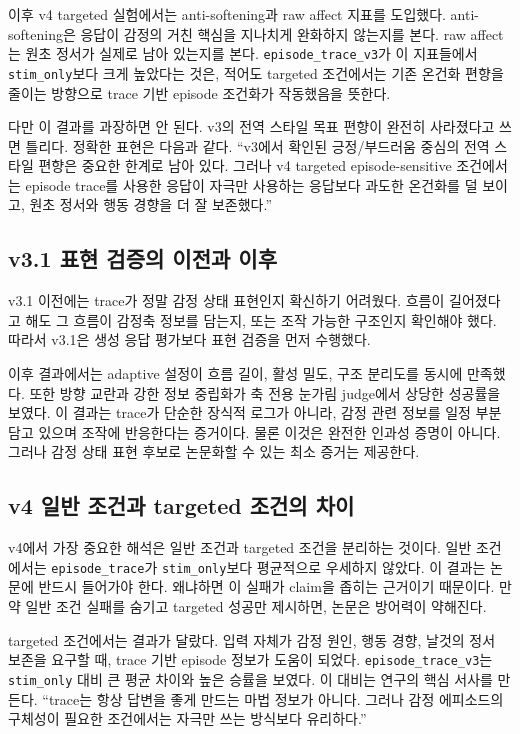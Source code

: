 \documentclass[11pt,a4paper]{article}
\newcommand{\eng}[1]{\texttt{#1}}
\begin{document}
이후 v4 targeted 실험에서는 anti-softening과 raw affect 지표를 도입했다. anti-softening은 응답이 감정의 거친 핵심을 지나치게 완화하지 않는지를 본다. raw affect는 원초 정서가 실제로 남아 있는지를 본다. \eng{episode\_trace\_v3}가 이 지표들에서 \eng{stim\_only}보다 크게 높았다는 것은, 적어도 targeted 조건에서는 기존 온건화 편향을 줄이는 방향으로 trace 기반 episode 조건화가 작동했음을 뜻한다.

다만 이 결과를 과장하면 안 된다. v3의 전역 스타일 목표 편향이 완전히 사라졌다고 쓰면 틀리다. 정확한 표현은 다음과 같다. ``v3에서 확인된 긍정/부드러움 중심의 전역 스타일 편향은 중요한 한계로 남아 있다. 그러나 v4 targeted episode-sensitive 조건에서는 episode trace를 사용한 응답이 자극만 사용하는 응답보다 과도한 온건화를 덜 보이고, 원초 정서와 행동 경향을 더 잘 보존했다.''

\subsection{v3.1 표현 검증의 이전과 이후}

v3.1 이전에는 trace가 정말 감정 상태 표현인지 확신하기 어려웠다. 흐름이 길어졌다고 해도 그 흐름이 감정축 정보를 담는지, 또는 조작 가능한 구조인지 확인해야 했다. 따라서 v3.1은 생성 응답 평가보다 표현 검증을 먼저 수행했다.

이후 결과에서는 adaptive 설정이 흐름 길이, 활성 밀도, 구조 분리도를 동시에 만족했다. 또한 방향 교란과 강한 정보 중립화가 축 전용 눈가림 judge에서 상당한 성공률을 보였다. 이 결과는 trace가 단순한 장식적 로그가 아니라, 감정 관련 정보를 일정 부분 담고 있으며 조작에 반응한다는 증거이다. 물론 이것은 완전한 인과성 증명이 아니다. 그러나 감정 상태 표현 후보로 논문화할 수 있는 최소 증거는 제공한다.

\subsection{v4 일반 조건과 targeted 조건의 차이}

v4에서 가장 중요한 해석은 일반 조건과 targeted 조건을 분리하는 것이다. 일반 조건에서는 \eng{episode\_trace}가 \eng{stim\_only}보다 평균적으로 우세하지 않았다. 이 결과는 논문에 반드시 들어가야 한다. 왜냐하면 이 실패가 claim을 좁히는 근거이기 때문이다. 만약 일반 조건 실패를 숨기고 targeted 성공만 제시하면, 논문은 방어력이 약해진다.

targeted 조건에서는 결과가 달랐다. 입력 자체가 감정 원인, 행동 경향, 날것의 정서 보존을 요구할 때, trace 기반 episode 정보가 도움이 되었다. \eng{episode\_trace\_v3}는 \eng{stim\_only} 대비 큰 평균 차이와 높은 승률을 보였다. 이 대비는 연구의 핵심 서사를 만든다. ``trace는 항상 답변을 좋게 만드는 마법 정보가 아니다. 그러나 감정 에피소드의 구체성이 필요한 조건에서는 자극만 쓰는 방식보다 유리하다.''
\end{document}
